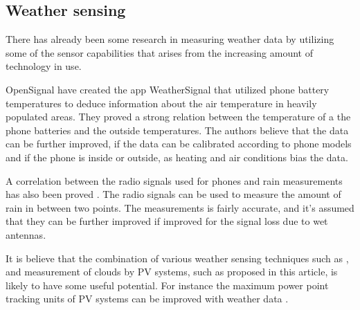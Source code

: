 \subsection{Weather sensing}
There has already been some research in measuring weather data by
utilizing some of the sensor capabilities that arises from the
increasing amount of technology in use.

OpenSignal have created the app WeatherSignal that utilized phone
battery temperatures \citep{temperatures2013} to deduce information
about the air temperature in heavily populated areas.  They proved a
strong relation between the temperature of a the phone batteries and
the outside temperatures.  The authors believe that the data can be
further improved, if the data can be calibrated according to phone
models and if the phone is inside or outside, as heating and air
conditions bias the data.

A correlation between the radio signals used for phones and rain
measurements has also been proved \citep{rainfall2007}.  The radio
signals can be used to measure the amount of rain in between two
points.  The measurements is fairly accurate, and it's assumed that
they can be further improved if improved for the signal loss due to
wet antennas.

It is believe that the combination of various weather sensing
techniques such as \cite{rainfall2007}, \cite{temperatures2013} and
measurement of clouds by PV systems, such as proposed in this article,
is likely to have some useful potential.  For instance the maximum
power point tracking units of PV systems can be improved with weather
data \citep{mppt2004}.

